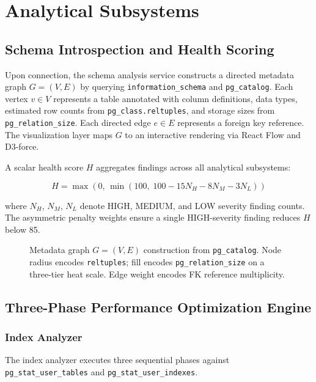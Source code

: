 \documentclass[12pt,a4paper]{report}
\begin{document}
\section{Analytical Subsystems}

\subsection{Schema Introspection and Health Scoring}

Upon connection, the schema analysis service constructs a directed metadata graph $G = (V, E)$ by querying \texttt{information\_schema} and \texttt{pg\_catalog}. Each vertex $v \in V$ represents a table annotated with column definitions, data types, estimated row counts from \texttt{pg\_class.reltuples}, and storage sizes from \texttt{pg\_relation\_size}. Each directed edge $e \in E$ represents a foreign key reference. The visualization layer maps $G$ to an interactive rendering via React Flow and D3-force.

A scalar health score $H$ aggregates findings across all analytical subsystems:

\begin{equation}
    H = \max\!\left(0,\, \min\!\left(100,\; 100 - 15N_H - 8N_M - 3N_L\right)\right)
\end{equation}

where $N_H$, $N_M$, $N_L$ denote HIGH, MEDIUM, and LOW severity finding counts. The asymmetric penalty weights ensure a single HIGH-severity finding reduces $H$ below 85.

\begin{figure}[htbp]
    \centering
    \fbox{\rule{0pt}{5cm}\rule{\textwidth}{0pt}}
    \caption{Metadata graph $G=(V,E)$ construction from \texttt{pg\_catalog}. Node radius encodes \texttt{reltuples}; fill encodes \texttt{pg\_relation\_size} on a three-tier heat scale. Edge weight encodes FK reference multiplicity.}
    \label{fig:schema-graph}
\end{figure}

\subsection{Three-Phase Performance Optimization Engine}

\subsubsection{Index Analyzer}

The index analyzer executes three sequential phases against \texttt{pg\_stat\_user\_tables} and \texttt{pg\_stat\_user\_indexes}.
\end{document}
